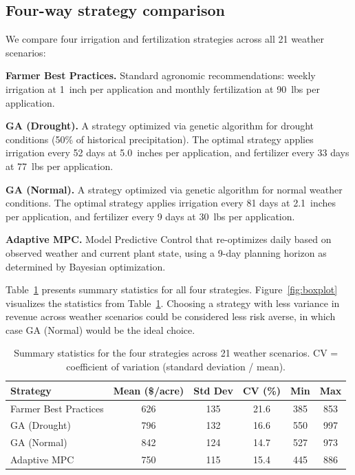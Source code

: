 \documentclass[preprint,12pt]{elsarticle}
\begin{document}
\subsection{Four-way strategy comparison}\label{subsec:comparison}

We compare four irrigation and fertilization strategies across all 21 weather scenarios:

\textbf{Farmer Best Practices.} Standard agronomic recommendations: weekly irrigation at 1~inch per application and monthly fertilization at 90~lbs per application.

\textbf{GA (Drought).} A strategy optimized via genetic algorithm for drought conditions (50\% of historical precipitation). The optimal strategy applies irrigation every 52 days at 5.0~inches per application, and fertilizer every 33 days at 77~lbs per application.

\textbf{GA (Normal).} A strategy optimized via genetic algorithm for normal weather conditions. The optimal strategy applies irrigation every 81 days at 2.1~inches per application, and fertilizer every 9 days at 30~lbs per application.

\textbf{Adaptive MPC.} Model Predictive Control that re-optimizes daily based on observed weather and current plant state, using a 9-day planning horizon as determined by Bayesian optimization.

Table~\ref{tab:main-results} presents summary statistics for all four strategies. Figure~\ref{fig:boxplot} visualizes the statistics from Table~\ref{tab:main-results}. Choosing a strategy with less variance in revenue across weather scenarios could be considered less risk averse, in which case GA (Normal) would be the ideal choice.

\begin{table}[ht]
\centering
\begin{tabular}{|l|c|c|c|c|c|}
\hline
Strategy & Mean (\$/acre) & Std Dev & CV (\%) & Min & Max \\
\hline\hline
Farmer Best Practices & 626 & 135 & 21.6 & 385 & 853 \\
GA (Drought)          & 796 & 132 & 16.6 & 550 & 997 \\
GA (Normal)           & 842 & 124 & 14.7 & 527 & 973 \\
Adaptive MPC          & 750 & 115 & 15.4 & 445 & 886 \\
\hline
\end{tabular}
\caption{Summary statistics for the four strategies across 21 weather scenarios. CV = coefficient of variation (standard deviation / mean).}
\label{tab:main-results}
\end{table}
\end{document}
